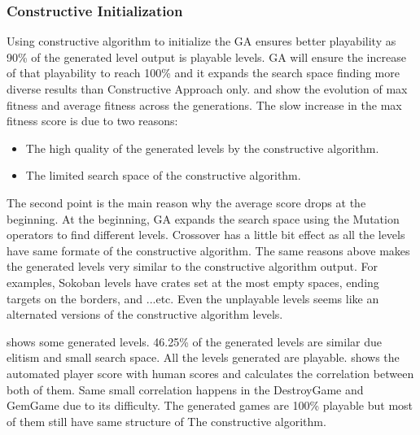 \subsubsection{Constructive Initialization}
Using constructive algorithm to initialize the GA ensures better playability as 90\% of the generated level output is playable levels. GA will ensure the increase of that playability to reach 100\% and it expands the search space finding more diverse results than Constructive Approach only.  and  show the evolution of max fitness and average fitness across the generations. The slow increase in the max fitness score is due to two reasons:
\begin{itemize} \itemsep0pt \parskip0pt 
	\item The high quality of the generated levels by the constructive algorithm.
	\item The limited search space of the constructive algorithm.
\end{itemize}
The second point is the main reason why the average score drops at the beginning. At the beginning, GA expands the search space using the Mutation operators to find different levels. Crossover has a little bit effect as all the levels have same formate of the constructive algorithm. The same reasons above makes the generated levels very similar to the constructive algorithm output. For examples, Sokoban levels have crates set at the most empty spaces, ending targets on the borders, and ...etc. Even the unplayable levels seems like an alternated versions of the constructive algorithm levels.\\\par



 shows some generated levels. 46.25\% of the generated levels are similar due elitism and small search space. All the levels generated are playable.  shows the automated player score with human scores and calculates the correlation between both of them. Same small correlation happens in the DestroyGame and GemGame due to its difficulty. The generated games are 100\% playable but most of them still have same structure of The constructive algorithm.

